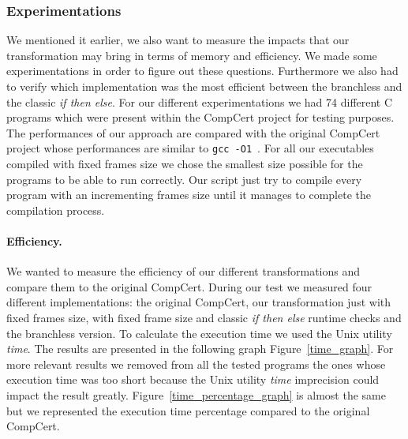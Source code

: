 \documentclass[11pt]{sdm}
\begin{document}
\subsubsection{Experimentations}

We mentioned it earlier, we also want to measure the impacts that our transformation may bring in terms of memory and efficiency.
We made some experimentations in order to figure out these questions.
Furthermore we also had to verify which implementation was the most efficient between the branchless and the classic \textit{if then else}.
For our different experimentations we had 74 different C programs which were present within the CompCert project for testing purposes.
The performances of our approach are compared with the original CompCert project whose performances are similar to \texttt{gcc -O1}~\cite{Leroy:2009:FVR:1538788.1538814}.
For all our executables compiled with fixed frames size we chose the smallest size possible for the programs to be able to run correctly. Our script just try to compile every program with an incrementing frames size until it manages to complete the compilation process.

\paragraph{Efficiency.}
We wanted to measure the efficiency of our different transformations and compare them to the original CompCert. During our test we measured four different implementations: the original CompCert, our transformation just with fixed frames size, with fixed frame size and classic \textit{if then else} runtime checks and the branchless version.
To calculate the execution time we used the Unix utility \textit{time}.
The results are presented in the following graph Figure~\ref{time_graph}.
For more relevant results we removed from all the tested programs the ones whose execution time was too short because the Unix utility \textit{time} imprecision could impact the result greatly.
Figure~\ref{time_percentage_graph} is almost the same but we represented the execution time percentage compared to the original CompCert.
\end{document}

